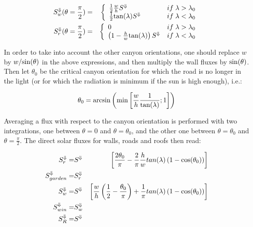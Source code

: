 \begin{eqnarray}
S_w^\Downarrow (\theta=\frac{\pi}{2}) &=&\left\{\begin{array}{ll}
\frac{1}{2} \frac{w}{h} S^\Downarrow& \hspace*{1.cm} if\; \lambda > \lambda_0 \nonumber \\
\frac{1}{2} {\rm tan}(\lambda) S^\Downarrow& \hspace*{1.cm} if\; \lambda < \lambda_0 \nonumber
\end{array}
\right.
\nonumber \\
S_r^\Downarrow (\theta=\frac{\pi}{2})&=& \left\{\begin{array}{ll}
0&if\; \lambda > \lambda_0 \nonumber \\
\left( 1 - \frac{h}{w}{\rm tan}(\lambda)\right)S^\Downarrow& if\; \lambda <
\lambda_0
\end{array}
\right.
\nonumber
\end{eqnarray}





In order to take into account the other canyon orientations, one should
replace $w$ by $w/{\rm sin}(\theta)$ in the above expressions, and then 
multiply the wall fluxes by ${\rm sin}(\theta)$.
Then let $\theta_0$ be the critical canyon orientation for which
the road is no longer in the light (or for which the radiation is minimum
if the sun is high enough), i.e.:

\begin{displaymath}
\theta_0 = {\rm arcsin}\left({\rm min}\left[\frac{w}{h}\frac{1}{{\rm tan}(\lambda)};1\right]\right)
\end{displaymath}

Averaging a flux with respect to the canyon orientation is performed
with two integrations, one between $\theta=0$ and $\theta=\theta_0$,
and the other one between $\theta=\theta_0$ and $\theta=\frac{\pi}{2}$.
The direct solar fluxes for walls, roads and roofs then read:

\begin{eqnarray}
S_r^\Downarrow = &{S^\Downarrow}& \left[\frac{2\theta_0 }{\pi}
 - \frac{2}{\pi} \frac{h}{w} tan(\lambda)
    \left( 1-{\rm cos}(\theta_0)\right)\right] \\
S_{garden}^\Downarrow = &S_r^\Downarrow & \\
S_w^\Downarrow = &{S^\Downarrow}& \left[
   \frac{w}{h}\left(\frac{1}{2}- \frac{\theta_0}{\pi}\right)
 + \frac{1}{\pi} tan(\lambda)
    \left(1-{\rm cos}(\theta_0)\right)\right]  \\
{S_{win}^\Downarrow} = &{S_w^\Downarrow}&  \\
{S_R^\Downarrow} = &{S^\Downarrow}&  
\end{eqnarray}

